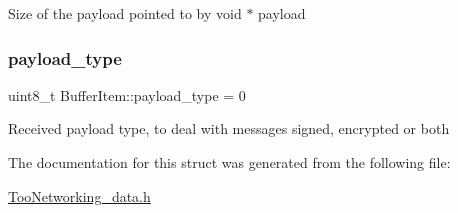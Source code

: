 Size of the payload pointed to by void $\ast$ payload \mbox{\label{structBufferItem_a3d7529f54e1e8ffaa3ee3b85ae0ebbbd}} 
\subsubsection{\texorpdfstring{payload\+\_\+type}{payload\_type}}
{\footnotesize\ttfamily uint8\+\_\+t Buffer\+Item\+::payload\+\_\+type = 0}

Received payload type, to deal with messages signed, encrypted or both 

The documentation for this struct was generated from the following file\+:\begin{DoxyCompactItemize}
\item 
\hyperlink{TooNetworking__data_8h}{Too\+Networking\+\_\+data.\+h}\end{DoxyCompactItemize}
